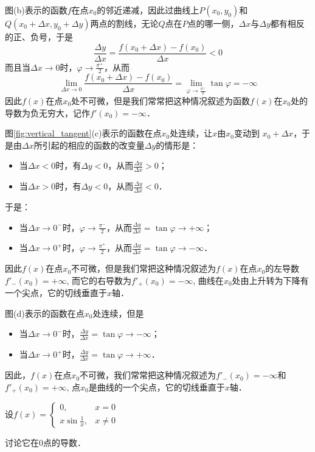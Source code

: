 图(b)表示的函数$f$在点$x_0$的邻近递减，因此过曲线上$P(x_0,y_0)$和$Q(x_0+\Delta x,y_0+\Delta y)$两点的割线，无论$Q$点在$P$点的哪一侧，$\Delta x$与$\Delta y$都有相反的正、负号，于是
\[\frac{\Delta y}{\Delta x}=\frac{f(x_0+\Delta x)-f(x_0)}{\Delta x}<0\]
而且当$\Delta x\to 0$时，$\varphi\to \frac{\pi^+}{2}$，从而
\[\lim_{\Delta x\to 0}\frac{f(x_0+\Delta x)-f(x_0)}{\Delta x}=\lim_{\varphi\to \tfrac{\pi^+}{2}}\tan\varphi=-\infty\]
因此$f(x)$在点$x_0$处不可微，但是我们常常把这种情况叙述为函数$f(x)$在$x_0$处的导数为负无穷大，记作$f'(x_0)=-\infty$．

图\ref{fig:vertical_tangent}(c)表示的函数在点$x_0$处连续，让$x$由$x_0$变动到
$x_0+\Delta x$，于是由$\Delta x$所引起的相应的函数的改变量$\Delta y$的情形是：
\begin{itemize}
    \item 当$\Delta x<0$时，有$\Delta y<0$，从而$\frac{\Delta y}{\Delta x}>0$；
    \item 当$\Delta x>0$时，有$\Delta y<  0$，从而$\frac{\Delta y}{\Delta x}<0$．
\end{itemize}
于是：
\begin{itemize}
    \item 当$\Delta x\to 0^-$时，$\varphi\to \frac{\pi^-}{2}$，从而$\frac{\Delta y}{\Delta x}=\tan\varphi\to +\infty$；
    \item 当$\Delta x\to 0^+$时，$\varphi\to \frac{\pi^+}{2}$，从而$\frac{\Delta y}{\Delta x}=\tan\varphi\to -\infty$．
\end{itemize}
因此$f(x)$在点$x_0$不可微，但是我们常把这种情况叙述为$f(x)$在点$x_0$的左导数$f'_-(x_0)=+\infty$, 而它的右导数为$f'_+(x_0)=-\infty$, 曲线在$x_0$处由上升转为下降有一个尖点，它的切线垂直于$x$轴．

图(d)表示的函数在点$x_0$处连续，但是
\begin{itemize}
    \item 当$\Delta x\to 0^-$时，$\frac{\Delta y}{\Delta x}=\tan\varphi\to -\infty$；
    \item 当$\Delta x\to 0^+$时，$\frac{\Delta y}{\Delta x}=\tan\varphi\to +\infty$．
\end{itemize}
因此，$f(x)$在点$x_0$不可微，我们常常把这种情况叙述为$f'_-(x_0)=-\infty$和$f'_+(x_0)=+\infty$, 点$x_0$是曲线的一个尖点，它的切线垂直于$x$轴．

\begin{example}
设$f(x)=\begin{cases}
    0,& x=0\\
    x\sin\frac{1}{x},& x\ne 0
\end{cases}$

讨论它在0点的导数．
\end{example}

